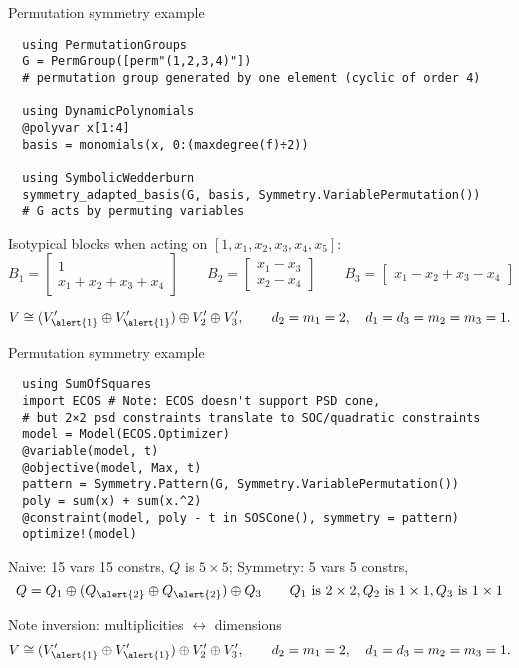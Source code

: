\begin{frame}[fragile]{Permutation symmetry example}
\footnotesize
\begin{verbatim}
  using PermutationGroups
  G = PermGroup([perm"(1,2,3,4)"])
  # permutation group generated by one element (cyclic of order 4)

  using DynamicPolynomials
  @polyvar x[1:4]
  basis = monomials(x, 0:(maxdegree(f)÷2))

  using SymbolicWedderburn
  symmetry_adapted_basis(G, basis, Symmetry.VariablePermutation())
  # G acts by permuting variables
\end{verbatim}

Isotypical blocks when acting on $[1, x_1, x_2, x_3, x_4, x_5]$:
\[
  B_1 = \begin{bmatrix}
          1\\
          x_1 + x_2 + x_3 + x_4
        \end{bmatrix}
  \qquad
  B_2 = \begin{bmatrix}
          x_1 - x_3\\
          x_2 - x_4
        \end{bmatrix}
  \qquad
  B_3 = \begin{bmatrix}
          x_1 - x_2 + x_3 - x_4
        \end{bmatrix}
\]

  \[V \cong (V_{\alert{1}}' \oplus V_{\alert{1}}') \oplus V_2' \oplus V_3', \qquad d_2 = m_1 = 2, \quad d_1 = d_3 = m_2 = m_3 = 1.\]
\end{frame}

\begin{frame}[fragile]{Permutation symmetry example}
\footnotesize
\begin{verbatim}
  using SumOfSquares
  import ECOS # Note: ECOS doesn't support PSD cone,
  # but 2×2 psd constraints translate to SOC/quadratic constraints
  model = Model(ECOS.Optimizer)
  @variable(model, t)
  @objective(model, Max, t)
  pattern = Symmetry.Pattern(G, Symmetry.VariablePermutation())
  poly = sum(x) + sum(x.^2)
  @constraint(model, poly - t in SOSCone(), symmetry = pattern)
  optimize!(model)
\end{verbatim}

\normalsize

  Naive: 15 vars 15 constrs, $Q$ is $5\times 5$; Symmetry: 5 vars 5 constrs,
  \[ Q = Q_1 \oplus (Q_{\alert{2}} \oplus Q_{\alert{2}}) \oplus Q_3 \qquad Q_1 \text{ is }2\times 2, Q_2 \text{ is }1\times 1, Q_3 \text{ is }1\times 1 \]

  Note inversion: multiplicities $\leftrightarrow$ dimensions
  \[V \cong (V_{\alert{1}}' \oplus V_{\alert{1}}') \oplus V_2' \oplus V_3', \qquad d_2 = m_1 = 2, \quad d_1 = d_3 = m_2 = m_3 = 1.\]

\end{frame}

